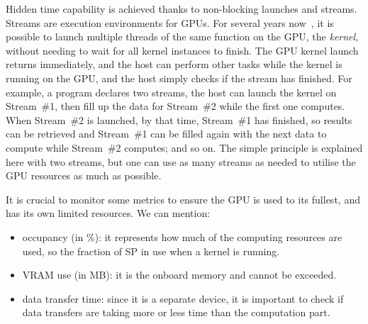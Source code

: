 Hidden time capability is achieved thanks to non-blocking launches and streams. Streams are execution environments for GPUs. For several years now~\cite{nvidia:keplerarch}, it is possible to launch multiple threads of the same function on the GPU, the \emph{kernel}, without needing to wait for all kernel instances to finish. The GPU kernel launch returns immediately, and the host can perform other tasks while the kernel is running on the GPU, and the host simply checks if the stream has finished. For example, a program declares two streams, the host can launch the kernel on Stream~\#1, then fill up the data for Stream~\#2 while the first one computes. When Stream~\#2 is launched, by that time, Stream~\#1 has finished, so results can be retrieved and Stream~\#1 can be filled again with the next data to compute while Stream~\#2 computes; and so on. The simple principle is explained here with two streams, but one can use as many streams as needed to utilise the GPU resources as much as possible.

It is crucial to monitor some metrics to ensure the GPU is used to its fullest, and has its own limited resources. We can mention:

\begin{itemize}
	\item occupancy (in \%): it represents how much of the computing resources are used, so the fraction of SP in use when a kernel is running.
	\item VRAM use (in MB): it is the onboard memory and cannot be exceeded.
	\item data transfer time: since it is a separate device, it is important to check if data transfers are taking more or less time than the computation part.
\end{itemize}
